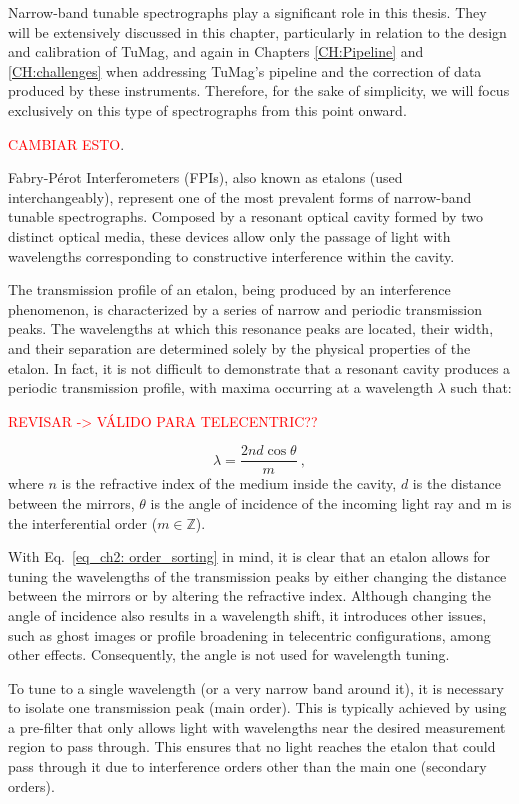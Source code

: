 Narrow-band tunable spectrographs play a significant role in this thesis. They will be extensively discussed in this chapter, particularly in relation to the design and calibration of TuMag, and again in Chapters \ref{CH:Pipeline} and \ref{CH:challenges} when addressing TuMag's pipeline and the correction of data produced by these instruments. Therefore, for the sake of simplicity, we will focus exclusively on this type of spectrographs from this point onward.

\textcolor{red}{CAMBIAR ESTO}.

Fabry-Pérot Interferometers (FPIs), also known as etalons (used interchangeably), represent one of the most prevalent forms of narrow-band tunable spectrographs. Composed by a resonant optical cavity formed by two distinct optical media, these devices allow only the passage of light with wavelengths corresponding to constructive interference within the cavity. 

The transmission profile of an etalon, being produced by an interference phenomenon, is characterized by a series of narrow and periodic transmission peaks. The wavelengths at which this resonance peaks are located, their width, and their separation are determined solely by the physical properties of the etalon. In fact, it is not difficult to demonstrate \citep{franI} that a resonant cavity produces a periodic transmission profile, with maxima occurring at a wavelength $\lambda$ such that:

\textcolor{red}{REVISAR -> VÁLIDO PARA TELECENTRIC??} 

\begin{equation}
\lambda = \frac{2nd\cos \theta}{m}\ ,
\label{eq_ch2: order_sorting}
\end{equation}
where $n$ is the refractive index of the medium inside the cavity, $d$ is the distance between the mirrors, $\theta$ is the angle of incidence of the incoming light ray and m is the interferential order ($m \in \mathbb{Z} $). 

With Eq.~\eqref{eq_ch2: order_sorting} in mind, it is clear that an etalon allows for tuning the wavelengths of the transmission peaks by either changing the distance between the mirrors or by altering the refractive index. Although changing the angle of incidence also results in a wavelength shift, it introduces other issues, such as ghost images or profile broadening in telecentric configurations, among other effects. Consequently, the angle is not used for wavelength tuning.

To tune to a single wavelength (or a very narrow band around it), it is necessary to isolate one transmission peak (main order). This is typically achieved by using a pre-filter that only allows light with wavelengths near the desired measurement region to pass through. This ensures that no light reaches the etalon that could pass through it due to interference orders other than the main one (secondary orders). 

